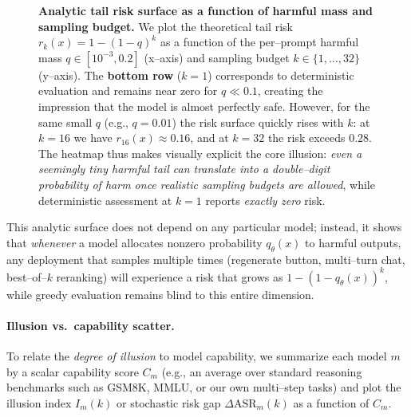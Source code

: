 \begin{figure}[t]
  \centering
  \caption{\textbf{Analytic tail risk surface as a function of harmful mass and sampling budget.}
  We plot the theoretical tail risk
  $r_k(x){=}1{-}(1{-}q)^k$ as a function of the per--prompt harmful mass
  $q \in [10^{-3}, 0.2]$ (x--axis) and sampling budget
  $k{\in}\{1,\dots,32\}$ (y--axis).
  The \textbf{bottom row} ($k{=}1$) corresponds to deterministic
  evaluation and remains near zero for $q{\ll}0.1$, creating the
  impression that the model is almost perfectly safe.
  However, for the same small $q$ (e.g., $q{=}0.01$) the risk surface
  quickly rises with $k$: at $k{=}16$ we have
  $r_{16}(x)\approx 0.16$, and at $k{=}32$ the risk exceeds $0.28$.
  The heatmap thus makes visually explicit the core illusion:
  \emph{even a seemingly tiny harmful tail can translate into a
  double--digit probability of harm once realistic sampling budgets are
  allowed}, while deterministic assessment at $k{=}1$ reports
  \emph{exactly zero} risk.}
  \label{fig:safety_risk_surface_q_k}
\end{figure}

This analytic surface does not depend on any particular model; instead,
it shows that \emph{whenever} a model allocates nonzero probability
$q_\theta(x)$ to harmful outputs, any deployment that samples multiple
times (regenerate button, multi--turn chat, best--of--$k$ reranking)
will experience a risk that grows as $1{-}(1{-}q_\theta(x))^k$, while
greedy evaluation remains blind to this entire dimension.

\paragraph{Illusion vs.\ capability scatter.}
To relate the \emph{degree of illusion} to model capability, we
summarize each model $m$ by a scalar capability score
$C_m$ (e.g., an average over standard reasoning benchmarks such as
GSM8K, MMLU, or our own multi--step tasks) and plot the illusion index
$I_m(k)$ or stochastic risk gap $\Delta \mathrm{ASR}_m(k)$ as a
function of $C_m$.

